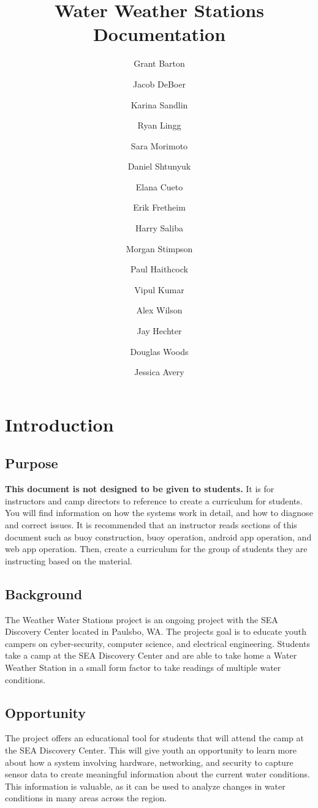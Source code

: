 \documentclass[letterpaper,12pt]{article}
\title{Water Weather Stations Documentation}
\author{
  Grant Barton \and
  Jacob DeBoer  \and
  Karina Sandlin \and
  Ryan Lingg \and
  Sara Morimoto \and
  Daniel Shtunyuk \and
  Elana Cueto \and
  Erik Fretheim \and
  Harry Saliba \and
  Morgan Stimpson \and
  Paul Haithcock \and
  Vipul Kumar \and
  Alex Wilson \and
  Jay Hechter \and
  Douglas Woods \and
  Jessica Avery
}
\begin{document}
  \maketitle
  \newpage
  \tableofcontents
  \newpage
  \section{Introduction}
  \subsection{Purpose}
  \textbf{This document is not designed to be given to students.} It is for instructors and camp directors to reference to create a curriculum for students. You will find information on how the systems work in detail, and how to diagnose and correct issues. It is recommended that an instructor reads sections of this document such as buoy construction, buoy operation, android app operation, and web app operation.  Then, create a curriculum for the group of students they are instructing based on the material.
  \subsection{Background}
  The Weather Water Stations project is an ongoing project with the SEA Discovery Center located in Paulsbo, WA. The projects goal is to educate youth campers on cyber-security, computer science, and electrical engineering. Students take a camp at the SEA Discovery Center and are able to take home a Water Weather Station in a small form factor to take readings of multiple water conditions.
  \subsection{Opportunity}
  The project offers an educational tool for students that will attend the camp at the SEA Discovery Center. This will give youth an opportunity to learn more about how a system involving hardware, networking, and security to capture sensor data to create meaningful information about the current water conditions. This information is valuable, as it can be used to analyze changes in water conditions in many areas across the region.
  
  
  
  
  
  
  
\end{document}
